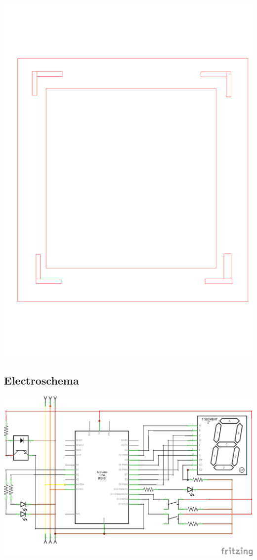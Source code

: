 \begin{center}
\includegraphics[height=0.3\textheight, angle = 0]{src/ontwerp/tussenplateau.pdf}
\end{center}

\subsection{Electroschema}
\begin{center}
\includegraphics[width=0.7\textheight, angle = 0]{src/schema/verdieping_schema.png}
\end{center}